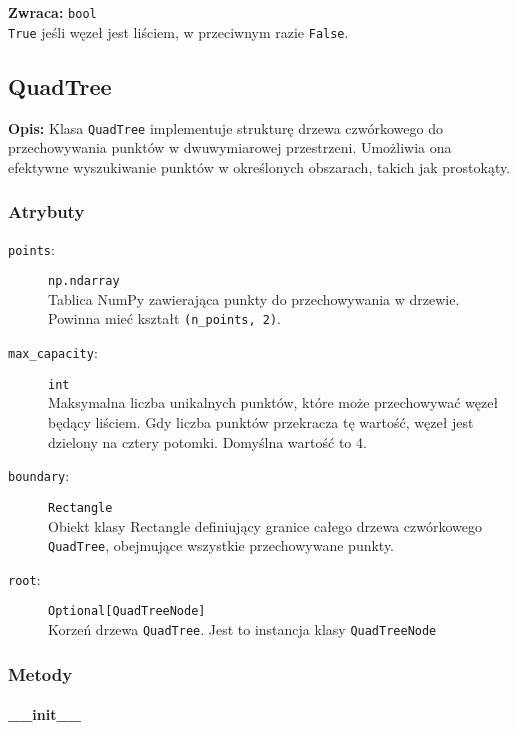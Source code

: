 \documentclass[12pt]{article}
\begin{document}
\textbf{Zwraca:} 
\texttt{bool} \\
\texttt{True} jeśli węzeł jest liściem, w przeciwnym razie \texttt{False}.

\subsection{QuadTree}

\textbf{Opis:} Klasa \texttt{QuadTree} implementuje strukturę drzewa czwórkowego do przechowywania punktów w dwuwymiarowej przestrzeni. Umożliwia ona efektywne wyszukiwanie punktów w określonych obszarach, takich jak prostokąty.

\subsubsection{Atrybuty}

\begin{description}
    \item[\texttt{points}:] \texttt{np.ndarray} \\
    Tablica NumPy zawierająca punkty do przechowywania w drzewie. Powinna mieć kształt \texttt{(n\_points, 2)}.
    
    \item[\texttt{max\_capacity}:] \texttt{int} \\
    Maksymalna liczba unikalnych punktów, które może przechowywać węzeł będący liściem. Gdy liczba punktów przekracza tę wartość, węzeł jest dzielony na cztery potomki. Domyślna wartość to 4.
    
    \item[\texttt{boundary}:] \texttt{Rectangle} \\
    Obiekt klasy Rectangle definiujący granice całego drzewa czwórkowego \texttt{QuadTree}, obejmujące wszystkie przechowywane punkty.
    
    \item[\texttt{root}:] \texttt{Optional[QuadTreeNode]} \\
    Korzeń drzewa \texttt{QuadTree}. Jest to instancja klasy \texttt{QuadTreeNode}
\end{description}

\subsubsection{Metody}

\paragraph{\_\_init\_\_}
\end{document}
